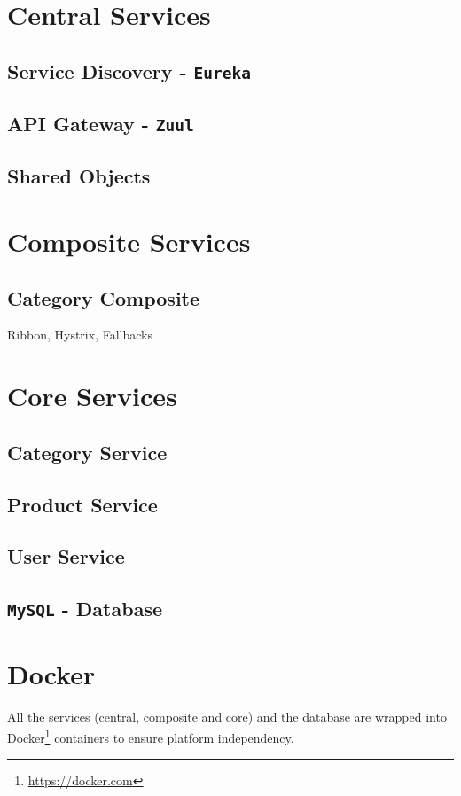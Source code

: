 \documentclass[11pt]{article}
\begin{document}
	
	\section{Central Services}
	\subsection{Service Discovery - \texttt{Eureka}}
	\subsection{API Gateway - \texttt{Zuul}}
	\subsection{Shared Objects}
	
	\section{Composite Services}
	\subsection{Category Composite}
	Ribbon, Hystrix, Fallbacks
	
	\section{Core Services}
	\subsection{Category Service}
	\subsection{Product Service}
	\subsection{User Service}
	\subsection{\texttt{MySQL} - Database}
		
	\section{Docker}
	All the services (central, composite and core) and the database are wrapped into Docker\footnote{\url{https://docker.com}} containers to ensure platform independency.
	
\end{document}

